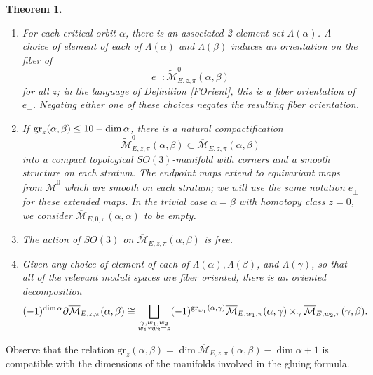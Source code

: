 \documentclass{memo-l}
\newtheorem{theorem}{Theorem}[chapter]
\theoremstyle{definition}
\theoremstyle{remark}
\numberwithin{section}{chapter}
\numberwithin{equation}{chapter}
\begin{document}
\begin{theorem}
\begin{enumerate}
\item For each critical orbit $\alpha$, there is an associated 2-element set $\Lambda(\alpha)$. A choice of element of each of $\Lambda(\alpha)$ and $\Lambda(\beta)$ induces an orientation on the fiber of $$e_-: \widetilde{\mathcal M}^0_{E,z,\pi}(\alpha, \beta)$$ for all $z$; in the language of Definition \ref{FOrient}, this is a fiber orientation of $e_-$. Negating either one of these choices negates the resulting fiber orientation.\\
\item If $\textup{gr}_z(\alpha, \beta) \leq 10 - \dim \alpha$, there is a natural compactification $$\widetilde{\mathcal M}^0_{E,z,\pi}(\alpha, \beta) \subset \overline{\mathcal M}_{E,z,\pi}(\alpha, \beta)$$ into a compact topological $SO(3)$-manifold with corners and a smooth structure on each stratum. The endpoint maps extend to equivariant maps from $\overline{\mathcal M}^0$ which are smooth on each stratum; we will use the same notation $e_\pm$ for these extended maps. In the trivial case $\alpha = \beta$ with homotopy class $z = 0$, we consider $\overline{\mathcal M}_{E,0,\pi}(\alpha, \alpha)$ to be empty.\\
\item The action of $SO(3)$ on $\overline{\mathcal M}_{E,z,\pi}(\alpha, \beta)$ is free.\\
\item Given any choice of element of each of $\Lambda(\alpha), \Lambda(\beta)$, and $\Lambda(\gamma)$, so that all of the relevant moduli spaces are fiber oriented, there is an oriented decomposition $$(-1)^{\dim \alpha}\partial \overline{\mathcal M}_{E,z,\pi}(\alpha, \beta) \cong \bigsqcup_{\substack{\gamma, w_1, w_2 \\ w_1 \ast w_2 = z}} (-1)^{\textup{gr}_{w_1}(\alpha, \gamma)} \overline{\mathcal M}_{E,w_1,\pi}(\alpha, \gamma) \times_\gamma \overline{\mathcal M}_{E,w_2,\pi}(\gamma, \beta).$$
\end{enumerate}
\end{theorem}

Observe that the relation $\text{gr}_z(\alpha, \beta) = \dim \overline{\mathcal M}_{E,z,\pi}(\alpha, \beta) - \dim \alpha + 1$ is compatible with the dimensions of the manifolds involved in the gluing formula.
\end{document}
